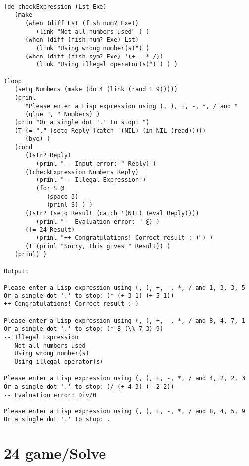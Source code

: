 \begin{verbatim}

(de checkExpression (Lst Exe)
   (make
      (when (diff Lst (fish num? Exe))
         (link "Not all numbers used" ) )
      (when (diff (fish num? Exe) Lst)
         (link "Using wrong number(s)") )
      (when (diff (fish sym? Exe) '(+ - * /))
         (link "Using illegal operator(s)") ) ) )

(loop
   (setq Numbers (make (do 4 (link (rand 1 9)))))
   (prinl
      "Please enter a Lisp expression using (, ), +, -, *, / and "
      (glue ", " Numbers) )
   (prin "Or a single dot '.' to stop: ")
   (T (= "." (setq Reply (catch '(NIL) (in NIL (read)))))
      (bye) )
   (cond
      ((str? Reply)
         (prinl "-- Input error: " Reply) )
      ((checkExpression Numbers Reply)
         (prinl "-- Illegal Expression")
         (for S @
            (space 3)
            (prinl S) ) )
      ((str? (setq Result (catch '(NIL) (eval Reply))))
         (prinl "-- Evaluation error: " @) )
      ((= 24 Result)
         (prinl "++ Congratulations! Correct result :-)") )
      (T (prinl "Sorry, this gives " Result)) )
   (prinl) )

Output:

Please enter a Lisp expression using (, ), +, -, *, / and 1, 3, 3, 5
Or a single dot '.' to stop: (* (+ 3 1) (+ 5 1))
++ Congratulations! Correct result :-)

Please enter a Lisp expression using (, ), +, -, *, / and 8, 4, 7, 1
Or a single dot '.' to stop: (* 8 (\% 7 3) 9)
-- Illegal Expression
   Not all numbers used
   Using wrong number(s)
   Using illegal operator(s)

Please enter a Lisp expression using (, ), +, -, *, / and 4, 2, 2, 3
Or a single dot '.' to stop: (/ (+ 4 3) (- 2 2))
-- Evaluation error: Div/0

Please enter a Lisp expression using (, ), +, -, *, / and 8, 4, 5, 9
Or a single dot '.' to stop: .

\end{verbatim}

\section*{24 game/Solve}

